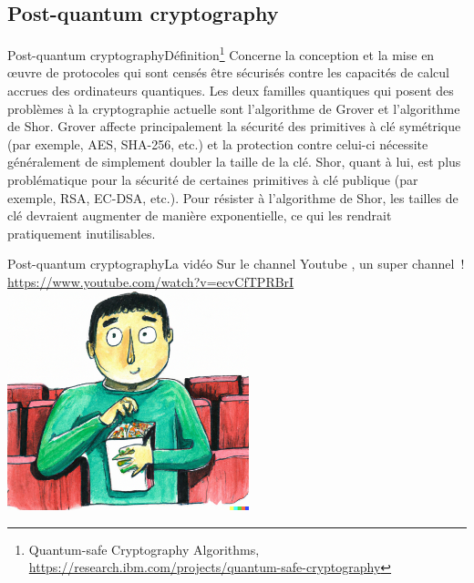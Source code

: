 \documentclass{beamer}
\begin{document}
    \subsection{Post-quantum cryptography}\label{subsec:pqc}
    \begin{frame}{Post-quantum cryptography}{Définition\footnote{Quantum-safe Cryptography Algorithms, \url{https://research.ibm.com/projects/quantum-safe-cryptography}}}
        Concerne la conception et la mise en œuvre de protocoles qui sont censés être sécurisés contre les capacités de calcul accrues des ordinateurs quantiques.
        Les deux familles quantiques qui posent des problèmes à la cryptographie actuelle sont l'algorithme de Grover et l'algorithme de Shor.
        \bigbreak
        Grover affecte principalement la sécurité des primitives à clé symétrique (par exemple, AES, SHA-256, etc.) et la protection contre celui-ci nécessite généralement de simplement doubler la taille de la clé.
        \bigbreak
        Shor, quant à lui, est plus problématique pour la sécurité de certaines primitives à clé publique (par exemple, RSA, EC-DSA, etc.).
        Pour résister à l'algorithme de Shor, les tailles de clé devraient augmenter de manière exponentielle, ce qui les rendrait pratiquement inutilisables.
    \end{frame}

    \begin{frame}{Post-quantum cryptography}{La vidéo}
        Sur le channel Youtube , un super channel~! \url{https://www.youtube.com/watch?v=ecvCfTPRBrI}
        \bigbreak
        \centering
        \includegraphics[width=7cm]{image/man-at-the-cinema-eating pop-corn}
    \end{frame}
\end{document}
